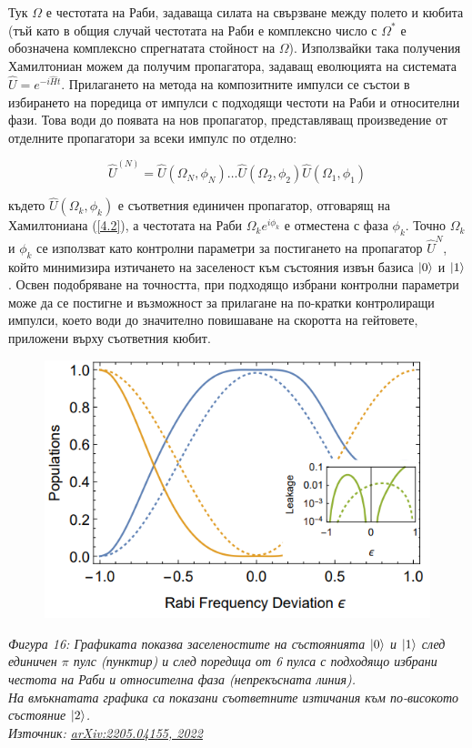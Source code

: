     Тук $\Omega$ е честотата на Раби, задаваща силата на свързване между полето и кюбита (тъй като в общия случай честотата на Раби е комплексно число с $\Omega^*$ е обозначена комплексно
    спрегнатата стойност на $\Omega$). Използвайки така получения Хамилтониан можем да получим пропагатора, задаващ еволюцията на системата $\hat{U} = e^{-i\hat{H}t}$. Прилагането на метода
    на композитните импулси се състои в избирането на поредица от импулси с подходящи честоти на Раби и относителни фази. Това води до появата на нов пропагатор, представляващ произведение
    от отделните пропагатори за всеки импулс по отделно:

    \begin{equation}
        \hat{U}^{(N)} = \hat{U}(\Omega_N,\phi_N)\dots \hat{U}(\Omega_2, \phi_2)\hat{U}(\Omega_1,\phi_1)
    \end{equation}

    където $\hat{U}(\Omega_k,\phi_k)$ е съответния единичен пропагатор, отговарящ на Хамилтониана (\ref{4.2}), а честотата на Раби $\Omega_k e^{i\phi_k}$ е отместена с фаза $\phi_k$. Точно
    $\Omega_k$ и $\phi_k$ се използват като контролни параметри за постигането на пропагатор $\hat{U}^{N}$, който минимизира изтичането на заселеност към състояния извън базиса $\ket{0}$ и $\ket{1}$.
    Освен подобряване на точността, при подходящо избрани контролни параметри може да се постигне и възможност за прилагане на по-кратки контролиращи импулси, което води до значително повишаване на
    скоротта на гейтовете, приложени върху съответния кюбит.

    \begin{figure}[H]
        \centering
        \includegraphics[width=330pt]{6.png}
    \end{figure}
    \begin{center}
        \small \textit{Фигура 16: Графиката показва заселеностите на състоянията $\ket{0}$ и $\ket{1}$ след единичен $\pi$ пулс (пунктир) и след поредица от 6 пулса с подходящо избрани честота на Раби и относителна фаза (непрекъсната линия).\\
        На вмъкнатата графика са показани съответните изтичания към по-високото състояние $\ket{2}$.\\
        Източник: \href{https://arxiv.org/pdf/2205.04155.pdf}{arXiv:2205.04155, 2022}} \cite{torosov2022fast}
    \end{center}

